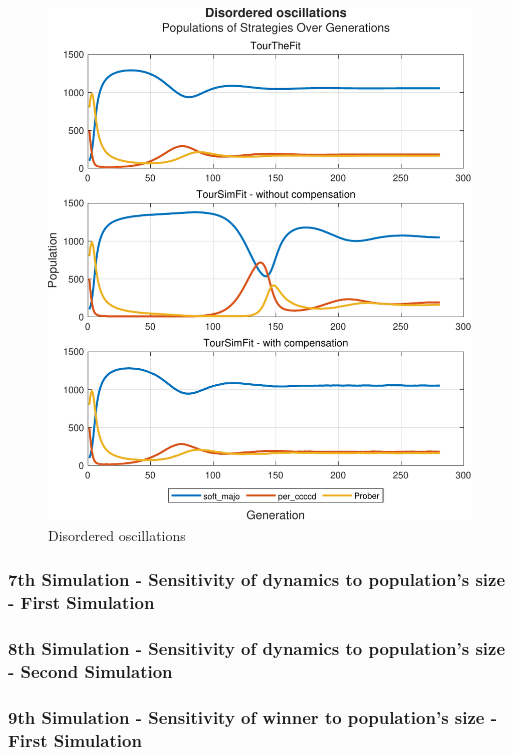 \documentclass[12pt]{article}
\begin{document}
	\begin{figure}[h]
	      \centering
	      \includegraphics[scale=0.8]{Disordered oscillations.pdf}
	      \caption{Disordered oscillations}
	      \label{fig:Disordered oscillations}
	\end{figure}

\subsubsection{7th Simulation - Sensitivity of dynamics to population's size - First Simulation}

\subsubsection{8th Simulation - Sensitivity of dynamics to population's size - Second Simulation}

\subsubsection{9th Simulation - Sensitivity of winner to population's size - First Simulation}
\end{document}
